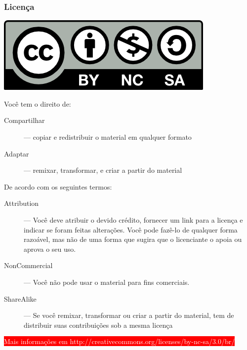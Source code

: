 \documentclass[xcolor=dvipsnames]{beamer}
\newcommand{\bred}[1]{\colorbox{red}{\textcolor{white}{#1}}}
\begin{document}
\begin{frame}
    \frametitle{Licença}
\begin{center}
\includegraphics[scale=0.7]{by-nc-sa.png}\\
\end{center}
\begin{block}{Você tem o direito de:}
\scriptsize{\begin{description}
\item[Compartilhar] --- copiar e redistribuir o material em qualquer 
formato
\item[Adaptar] --- remixar, transformar, e criar a partir do material
\end{description}}
\end{block}
\begin{block}{De acordo com os seguintes termos:}
\scriptsize{\begin{description}
\item[Attribution] --- Você deve atribuir o devido crédito, fornecer um link 
para a licença e indicar se foram feitas alterações. Você pode fazê-lo de 
qualquer forma razoável, mas não de uma forma que sugira que o licenciante o 
apoia ou aprova o seu uso.
\item[NonCommercial] --- Você não pode usar o material para fins comerciais.
\item[ShareAlike] --- Se você remixar, transformar ou criar a partir do 
material, tem de distribuir suas contribuições sob a mesma licença
\end{description}}
\end{block}
\bred{\footnotesize{Mais informações em 
http://creativecommons.org/licenses/by-nc-sa/3.0/br/}}
\end{frame}
\end{document}
